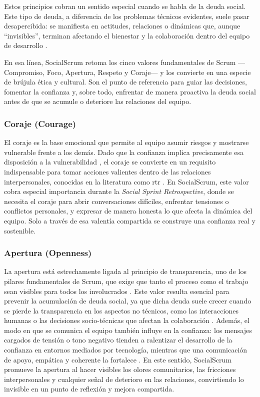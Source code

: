 Estos principios cobran un sentido especial cuando se habla de la deuda social. Este tipo de deuda, a diferencia de los problemas técnicos evidentes, suele pasar desapercibida: se manifiesta en actitudes, relaciones o dinámicas que, aunque ``invisibles'', terminan afectando el bienestar y la colaboración dentro del equipo de desarrollo \cite{saeeda2024nontechnicaldebt,caballero2022communitysmells}.

En esa línea, SocialScrum retoma los cinco valores fundamentales de Scrum —Compromiso, Foco, Apertura, Respeto y Coraje— \cite{schwaber2020scrum} y los convierte en una especie de brújula ética y cultural. Son el punto de referencia para guiar las decisiones, fomentar la confianza y, sobre todo, enfrentar de manera proactiva la deuda social antes de que se acumule o deteriore las relaciones del equipo.

\subsubsection{Coraje (Courage)}
El coraje es la base emocional que permite al equipo asumir riesgos y mostrarse vulnerable frente a los demás.
Dado que la confianza implica precisamente esa disposición a la vulnerabilidad \cite{mayer_integrative_1995}, el coraje se convierte en un requisito indispensable para tomar acciones valientes dentro de las relaciones interpersonales, conocidas en la literatura como \gls{rtr} \cite{mayer_integrative_1995}.
En SocialScrum, este valor cobra especial importancia durante la \textit{Social Sprint Retrospective}, donde se necesita el coraje para abrir conversaciones difíciles, enfrentar tensiones o conflictos personales, y expresar de manera honesta lo que afecta la dinámica del equipo. Solo a través de esa valentía compartida se construye una confianza real y sostenible.

\subsubsection{Apertura (Openness)}
La apertura está estrechamente ligada al principio de transparencia, uno de los pilares fundamentales de Scrum, que exige que tanto el proceso como el trabajo sean visibles para todos los involucrados \cite{wilson_all_2006,schwaber2020scrum}.
Este valor resulta esencial para prevenir la acumulación de deuda social, ya que dicha deuda suele crecer cuando se pierde la transparencia en los aspectos no técnicos, como las interacciones humanas o las decisiones socio-técnicas que afectan la colaboración \cite{schwaber2020scrum,tamburri2013socialdebt}.
Además, el modo en que se comunica el equipo también influye en la confianza: los mensajes cargados de tensión o tono negativo tienden a ralentizar el desarrollo de la confianza en entornos mediados por tecnología, mientras que una comunicación de apoyo, empática y coherente la fortalece \cite{wilson_all_2006}.
En este sentido, SocialScrum promueve la apertura al hacer visibles los olores comunitarios, las fricciones interpersonales y cualquier señal de deterioro en las relaciones, convirtiendo lo invisible en un punto de reflexión y mejora compartida.

